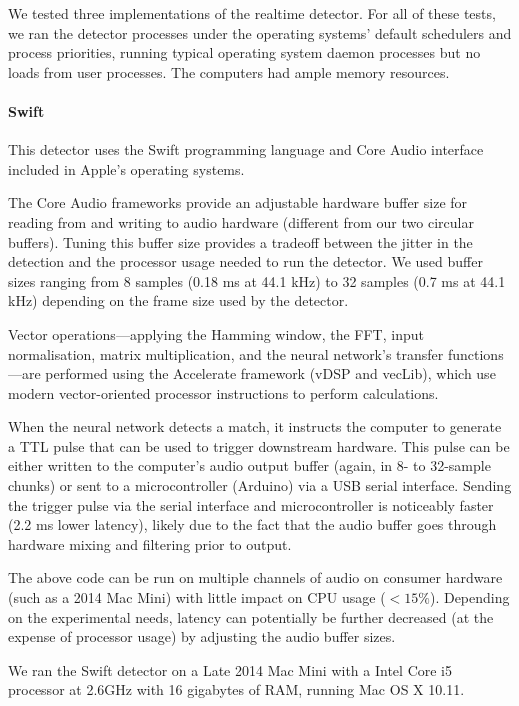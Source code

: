 \documentclass[10pt,letterpaper]{article}
\renewcommand{\subsubsection}[1]{\paragraph{#1}}
\begin{document}
We tested three implementations of the realtime detector.  For all of
these tests, we ran the detector processes under the operating
systems' default schedulers and process priorities, running typical
operating system daemon processes but no loads from user processes.
The computers had ample memory resources.

\subsubsection{Swift}

This detector uses the Swift programming language and Core Audio
interface included in Apple's operating systems.

The Core Audio frameworks provide an adjustable hardware buffer size
for reading from and writing to audio hardware (different from our two
circular buffers). Tuning this buffer size provides a tradeoff between
the jitter in the detection and the processor usage needed to run the
detector. We used buffer sizes ranging from 8 samples (0.18 ms at 44.1
kHz) to 32 samples (0.7 ms at 44.1 kHz) depending on the frame size 
used by the detector.

Vector operations---applying the Hamming window, the FFT, input
normalisation, matrix multiplication, and the neural network's
transfer functions---are performed using the Accelerate framework
(vDSP and vecLib), which use modern vector-oriented processor
instructions to perform calculations.

When the neural network detects a match, it instructs the computer to
generate a TTL pulse that can be used to trigger downstream hardware.
This pulse can be either written to the computer's audio output buffer
(again, in 8- to 32-sample chunks) or sent to a microcontroller
(Arduino) via a USB serial interface. Sending the trigger pulse via
the serial interface and microcontroller is noticeably faster (2.2 ms
lower latency), likely due to the fact that the audio buffer goes
through hardware mixing and filtering prior to output.

The above code can be run on multiple channels of audio on consumer
hardware (such as a 2014 Mac Mini) with little impact on CPU usage
($<15\%$). Depending on the experimental needs, latency can potentially
be further decreased (at the expense of processor usage) by adjusting the audio
buffer sizes.

We ran the Swift detector on a Late 2014 Mac Mini with a Intel Core i5
processor at 2.6GHz  with 16 gigabytes of RAM, running Mac OS X 10.11.
\end{document}
